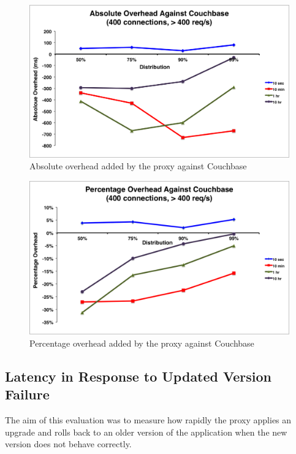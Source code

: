 \documentclass[a4paper,11pt,twoside]{report}
\begin{document}
\begin{figure}[!ht]
  \centering
     \includegraphics[scale=0.55]{absoloute-couchbase}
  \caption{Absolute overhead added by the proxy against Couchbase}
  \label{absoloute-couchbase}
\end{figure} 

\begin{figure}[!ht]
  \centering
     \includegraphics[scale=0.55]{percentage-couchbase}
  \caption{Percentage overhead added by the proxy against Couchbase}
  \label{percentage-couchbase}
\end{figure} 

\clearpage
\subsection{Latency in Response to Updated Version Failure}\label{Recovery}
The aim of this evaluation was to measure how rapidly the proxy applies an upgrade and rolls back to an older version of the application when the new version does not behave correctly. 
\end{document}
